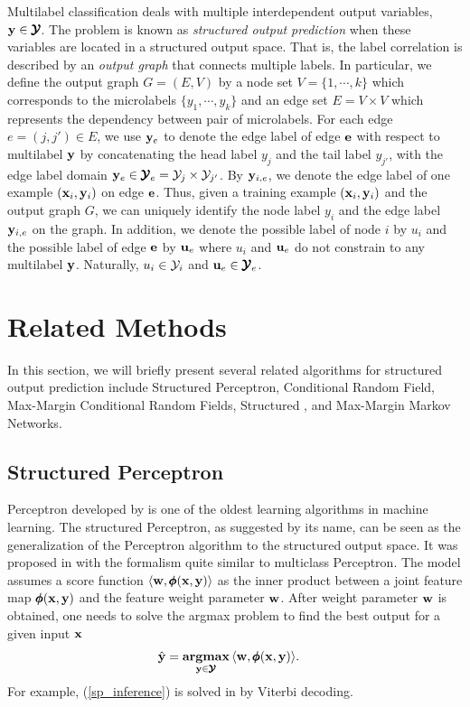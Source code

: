 {Multilabel classification deals with multiple interdependent output variables, $\mathbf {y}\in\pmb {\mathcal{Y}}$.
The problem is known as \textit{structured output prediction} when these variables are located in a structured output space.
That is, the label correlation is described by an \textit{output graph} that connects multiple labels.
In particular, we define the output graph $G=(E,V)$ by a node set $V=\{1,\cdots,k\}$ which corresponds to the microlabels $\{y_1,\cdots,y_k\}$ and an edge set $E=V\times V$ which represents the dependency between pair of microlabels.
For each edge $e=(j,j')\in E$, we use $\mathbf {y}_e$ to denote the edge label of edge $\mathbf {e}$ with respect to multilabel $\mathbf {y}$ by concatenating the head label $y_j$ and the tail label $y_{j'}$, with the edge label domain $\mathbf {y}_e\in\pmb {\mathcal{Y}}_e=\mathcal{Y}_j\times\mathcal{Y}_{j'}$.
By $\mathbf {y}_{i,e}$, we denote the edge label of one example $(\mathbf {x}_i,\mathbf {y}_i)$ on edge $\mathbf {e}$.
Thus, given a training example $(\mathbf {x}_i,\mathbf {y}_i)$ and the output graph $G$, we can uniquely identify the node label $y_i$ and the edge label $\mathbf {y}_{i,e}$ on the graph.
In addition, we denote the possible label of node $i$ by $u_i$ and the possible label of edge $\mathbf {e}$ by $\mathbf {u}_{e}$ where $u_i$ and $\mathbf {u}_{e}$ do not constrain to any multilabel $\mathbf {y}$.
Naturally, $u_i\in\mathcal{Y}_i$ and $\mathbf {u}_e\in\pmb {\mathcal{Y}}_e$.



%
%
\section{Related Methods}

In this section, we will briefly present several related algorithms for structured output prediction include Structured Perceptron, Conditional Random Field, Max-Margin Conditional Random Fields, Structured \svm, and Max-Margin Markov Networks.



%
%
\subsection{Structured Perceptron}

Perceptron developed by \citet{Rosenblatt58} is one of the oldest learning algorithms in machine learning.
The structured Perceptron, as suggested by its name, can be seen as the generalization of the Perceptron algorithm to the structured output space.
It was proposed in \citep{collins02a, collins02b} with the formalism quite similar to multiclass Perceptron. 
The model assumes a score function $\langle \mathbf {w}, \pmb \phi(\mathbf {x},\mathbf {y}) \rangle$ as the inner product between a joint feature map $\pmb \phi(\mathbf {x},\mathbf {y})$ and the feature weight parameter $\mathbf {w}$.
After weight parameter $\mathbf {w}$ is obtained, one needs to solve the {argmax} problem to find the best output for a given input $\mathbf {x}$
\begin{align}
	\hat{\mathbf {y}} = \underset{\mathbf {y}\in\pmb {\mathcal{Y}}}{\textbf{argmax}} &\, \langle \mathbf {w}, \pmb \phi(\mathbf {x},\mathbf {y}) \rangle.  \label{sp_inference}
\end{align}
For example, (\ref{sp_inference}) is solved in \citep{collins02a} by Viterbi decoding.

}
